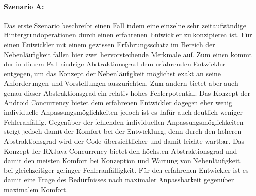 \documentclass[12pt,oneside,a4paper,bibtotoc,liststotoc]{scrreprt}
\begin{document}
\paragraph{Szenario A:}
Das erste Szenario beschreibt einen Fall indem eine einzelne sehr zeitaufwändige Hintergrundoperationen durch einen erfahrenen Entwickler zu konzipieren ist. Für einen Entwickler mit einem gewissen Erfahrungsschatz im Bereich der Nebenläufigkeit fallen hier zwei hervorstechende Merkmale auf. Zum einen kommt der in diesem Fall niedrige Abstraktionsgrad dem erfahrenden Entwickler entgegen, um das Konzept der Nebenläufigkeit möglichst exakt an seine Anforderungen und Vorstellungen auszurichten. Zum andern bietet aber auch genau dieser Abstraktionsgrad ein relativ hohes Fehlerpotential.
Das Konzept der Android Concurrency bietet dem erfahrenen Entwickler dagegen eher wenig individuelle Anpassungsmöglichkeiten jedoch ist es dafür auch deutlich weniger Fehleranfällig. Gegenüber der fehlenden individuellen Anpassungsmöglichkeiten steigt jedoch damit der Komfort bei der Entwicklung, denn durch den höheren Abstraktionsgrad wird der Code übersichtlicher und damit leichte wartbar.
Das Konzept der RXJava Concurrency bietet den höchsten Abstraktionsgrad und damit den meisten Komfort bei Konzeption und Wartung von Nebenläufigkeit, bei gleichzeitiger geringer Fehleranfälligkeit.
Für den erfahrenen Entwickler ist es damit eine Frage des Bedürfnisses nach maximaler Anpassbarkeit gegenüber maximalem Komfort.
\end{document}
